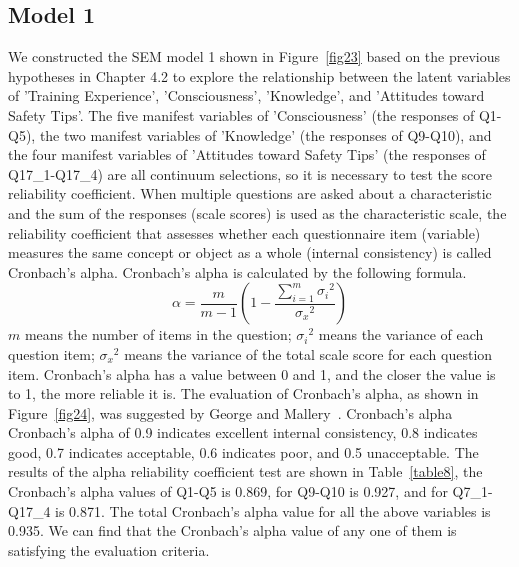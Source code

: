 \subsection{Model 1}

We constructed the SEM model 1 shown in Figure~\ref{fig23} based on the previous hypotheses in Chapter 4.2 to explore the relationship between the latent variables of 'Training Experience', 'Consciousness', 'Knowledge', and 'Attitudes toward Safety Tips'. The five manifest variables of 'Consciousness' (the responses of Q1-Q5), the two manifest variables of 'Knowledge' (the responses of Q9-Q10), and the four manifest variables of  'Attitudes toward Safety Tips' (the responses of Q17\_1-Q17\_4) are all continuum selections, so it is necessary to test the score reliability coefficient. When multiple questions are asked about a characteristic and the sum of the responses (scale scores) is used as the characteristic scale, the reliability coefficient that assesses whether each questionnaire item (variable) measures the same concept or object as a whole (internal consistency) is called Cronbach's alpha. Cronbach's alpha is calculated by the following formula. 
\begin{equation}
\alpha = \frac{m}{m-1} \left(1 - \frac{\displaystyle \sum_{i = 1}^m{{\sigma_i}^2}}{{\sigma_x}^2} \right)
\end{equation}
$m$ means the number of items in the question; ${\sigma_i}^2$ means the variance of each question item; ${\sigma_x}^2$ means the variance of the total scale score for each question item. Cronbach's alpha has a value between 0 and 1, and the closer the value is to 1, the more reliable it is. The evaluation of Cronbach's alpha, as shown in Figure~\ref{fig24}, was suggested by George and Mallery~\cite{ref1}. Cronbach's alpha  Cronbach's alpha of 0.9 indicates excellent internal consistency, 0.8 indicates good, 0.7 indicates acceptable, 0.6 indicates poor, and 0.5 unacceptable. The results of the alpha reliability coefficient test are shown in Table~\ref{table8}, the Cronbach's alpha values of Q1-Q5 is 0.869, for Q9-Q10 is 0.927, and for Q7\_1-Q17\_4 is 0.871. The total Cronbach's alpha value for all the above variables is 0.935. We can find that the Cronbach's alpha value of any one of them is satisfying the evaluation criteria.


